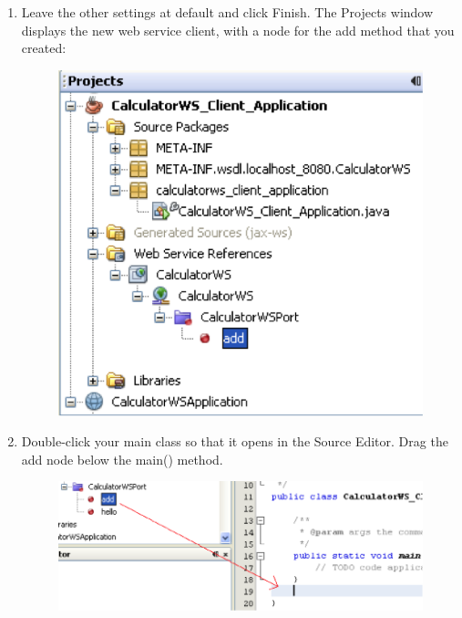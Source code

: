 \begin{enumerate}
\item Leave the other settings at default and click Finish.
The Projects window displays the new web service client, with a node for the add method that you created:

\begin{figure}
\begin{center}
\includegraphics[scale=1]{J13}
\label{J13}
\end{center}
\end{figure}

\item Double-click your main class so that it opens in the Source Editor. Drag the add node below the main() method.

\begin{figure}
\begin{center}
\includegraphics[scale=1]{J14}
\label{J14}
\end{center}
\end{figure}


\end{enumerate}
